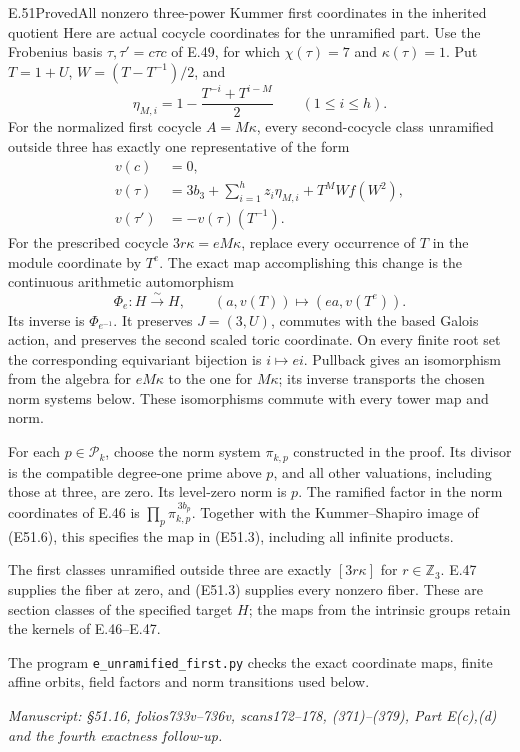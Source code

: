 \begin{statement}{E.51}{Proved}{All nonzero three-power Kummer first coordinates in the inherited quotient}
Here are actual cocycle coordinates for the unramified
part. Use the Frobenius basis $\tau,\tau'=c\tau c$
of E.49, for which $\chi(\tau)=7$ and
$\kappa(\tau)=1$. Put $T=1+U$,
$W=(T-T^{-1})/2$, and
\[
 \eta_{M,i}=1-\frac{T^{-i}+T^{i-M}}2
                           \qquad(1\le i\le h).
 \tag{E51.5}
\]
For the normalized first cocycle $A=M\kappa$, every
second-cocycle class unramified outside three has
exactly one representative of the form
\[
 \begin{split}
 v(c)&=0,\\
 v(\tau)&=3b_3+\sum_{i=1}^{h}z_i\eta_{M,i}
                                +T^M W f(W^2),\\
 v(\tau')&=-v(\tau)(T^{-1}).
 \end{split}                                                   \tag{E51.6}
\]
For the prescribed cocycle $3r\kappa=eM\kappa$,
replace every occurrence of $T$ in the module
coordinate by $T^e$. The exact map accomplishing
this change is the continuous arithmetic automorphism
\[
 \Phi_e:H\xrightarrow{\sim}H,
       \qquad (a,v(T))\longmapsto(ea,v(T^e)).
 \tag{E51.7}
\]
Its inverse is $\Phi_{e^{-1}}$. It preserves $J=(3,U)$,
commutes with the based Galois action, and preserves
the second scaled toric coordinate.
On every finite root set the corresponding equivariant
bijection is $i\mapsto ei$. Pullback gives an isomorphism
from the algebra for $eM\kappa$ to the one for $M\kappa$;
its inverse transports the chosen norm systems below.
These isomorphisms commute with every tower map and norm.

For each $p\in\mathscr P_k$, choose the norm system
$\pi_{k,p}$ constructed in the proof. Its divisor
is the compatible degree-one prime above $p$, and
all other valuations, including those at three,
are zero. Its level-zero norm is $p$. The ramified
factor in the norm coordinates of E.46 is
$\prod_p\pi_{k,p}^{\,3b_p}$. Together with the
Kummer--Shapiro image of (E51.6), this specifies the
map in (E51.3), including all infinite products.

The first classes unramified outside three are
exactly $[3r\kappa]$ for $r\in\mathbb Z_3$.
E.47 supplies the fiber at zero, and (E51.3) supplies
every nonzero fiber. These are section classes of
the specified target $H$; the maps from the
intrinsic groups retain the kernels of E.46--E.47.

The program \texttt{e\_unramified\_first.py} checks
the exact coordinate maps, finite affine orbits,
field factors and norm transitions used below.

\emph{Manuscript: \S51.16, folios733v--736v,
scans172--178, (371)--(379), Part E(c),(d) and
the fourth exactness follow-up.}
\end{statement}
